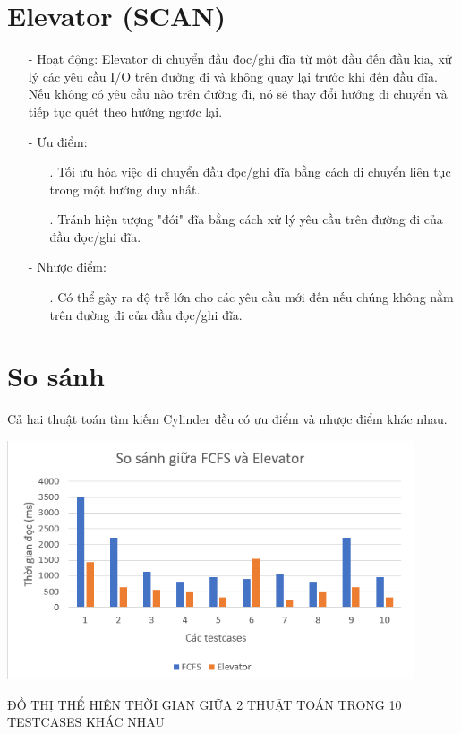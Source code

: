 \documentclass{report}
\begin{document}
    \section{Elevator (SCAN)}
        \begin{enumerate}
            \item[-] Hoạt động: Elevator di chuyển đầu đọc/ghi đĩa từ một đầu đến đầu kia, xử lý các yêu cầu I/O trên đường đi và không quay lại trước khi đến đầu đĩa. Nếu không có yêu cầu nào trên đường đi, nó sẽ thay đổi hướng di chuyển và tiếp tục quét theo hướng ngược lại.

            \item[-] Ưu điểm:
                \begin{enumerate}
                    \item[.] Tối ưu hóa việc di chuyển đầu đọc/ghi đĩa bằng cách di chuyển liên tục trong một hướng duy nhất.
                    \item[.] Tránh hiện tượng "đói" đĩa bằng cách xử lý yêu cầu trên đường đi của đầu đọc/ghi đĩa.
                \end{enumerate}
            \item[-] Nhược điểm:
                \begin{enumerate}
                    \item[.] Có thể gây ra độ trễ lớn cho các yêu cầu mới đến nếu chúng không nằm trên đường đi của đầu đọc/ghi đĩa.
                \end{enumerate}
        \end{enumerate}


    \section{So sánh}
        Cả hai thuật toán tìm kiếm Cylinder đều có ưu điểm và nhược điểm khác nhau.\\

        \begin{center}
            
        \includegraphics[width=12cm]{images/chartsosanh.png}
        
        ĐỒ THỊ THỂ HIỆN THỜI GIAN GIỮA 2 THUẬT TOÁN TRONG 10 TESTCASES KHÁC NHAU
        \end{center}
        
\end{document}
